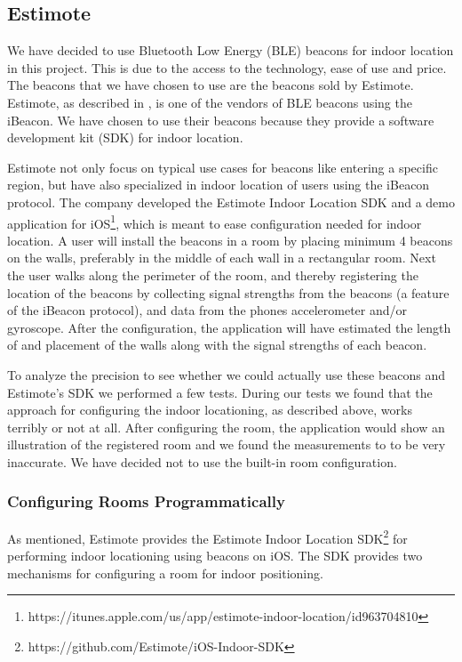 \subsection{Estimote}
We have decided to use Bluetooth Low Energy (BLE) beacons for indoor location in this project. 
This is due to the access to the technology, ease of use and price. 
The beacons that we have chosen to use are the beacons sold by Estimote. 
Estimote, as described in , is one of the vendors of BLE beacons using the iBeacon. 
We have chosen to use their beacons because they provide a software development kit (SDK) for indoor location. 

Estimote not only focus on typical use cases for beacons like entering a specific region, 
but have also specialized in indoor location of users using the iBeacon protocol. 
The company developed the Estimote Indoor Location SDK and a demo application for iOS\footnote{https://itunes.apple.com/us/app/estimote-indoor-location/id963704810}, 
which is meant to ease configuration needed for indoor location. 
A user will install the beacons in a room by placing minimum \num{4} beacons on the walls, preferably in the middle of each wall in a rectangular room.   
Next the user walks along the perimeter of the room, 
and thereby registering the location of the beacons by collecting signal strengths from the beacons (a feature of the iBeacon protocol), 
and data from the phones accelerometer and/or gyroscope.
After the configuration, the application will have estimated the length of and placement of the walls along with the signal strengths of each beacon.

To analyze the precision to see whether we could actually use these beacons and Estimote's SDK we performed a few tests. 
During our tests we found that the approach for configuring the indoor locationing, as described above, works terribly or not at all. 
After configuring the room, the application would show an illustration of the registered room and we found the measurements to to be very inaccurate.
We have decided not to use the built-in room configuration. 

\subsubsection{Configuring Rooms Programmatically}
As mentioned, Estimote provides the Estimote Indoor Location SDK\footnote{https://github.com/Estimote/iOS-Indoor-SDK} for performing indoor locationing using beacons on iOS. 
The SDK provides two mechanisms for configuring a room for indoor positioning.

